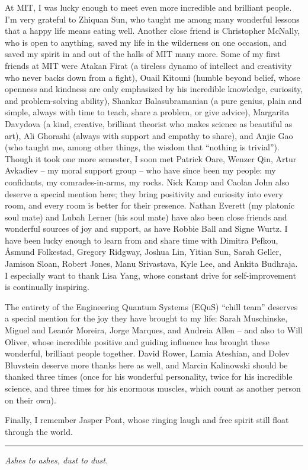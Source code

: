 At MIT, I was lucky enough to meet even more incredible and brilliant people.
%
I'm very grateful to Zhiquan Sun, who taught me among many wonderful lessons that a happy life means eating well.
%
Another close friend is Christopher McNally, who is open to anything, saved my life in the wilderness on one occasion, and saved my spirit in and out of the halls of MIT many more.
%
Some of my first friends at MIT were Atakan Firat (a tireless dynamo of intellect and creativity who never backs down from a fight), Ouail Kitouni (humble beyond belief, whose openness and kindness are only emphasized by his incredible knowledge, curiosity, and problem-solving ability), Shankar Balasubramanian (a pure genius, plain and simple, always with time to teach, share a problem, or give advice), Margarita Davydova (a kind, creative, brilliant theorist who makes science as beautiful as art), Ali Ghorashi (always with support and empathy to share), and Anjie Gao (who taught me, among other things, the wisdom that ``nothing is trivial'').
%
Though it took one more semester, I soon met Patrick Oare, Wenzer Qin, Artur Avkadiev -- my moral support group -- who have since been my people:
%
my confidants, my comrades-in-arms, my rocks.
%
Nick Kamp and Caolan John also deserve a special mention here;
%
they bring positivity and curiosity into every room, and every room is better for their presence.
%
Nathan Everett (my platonic soul mate) and Lubah Lerner (his soul mate) have also been close friends and wonderful sources of joy and support, as have Robbie Ball and Signe Wurtz.
%
I have been lucky enough to learn from and share time with Dimitra Pefkou, \r{A}smund Folkestad, Gregory Ridgway, Joshua Lin, Yitian Sun, Sarah Geller, Jamison Sloan, Robert Jones, Manu Srivastava, Kyle Lee, and Ankita Budhraja.
%
I especially want to thank Lisa Yang, whose constant drive for self-improvement is continually inspiring.


The entirety of the Engineering Quantum Systems (EQuS) ``chill team'' deserves a special mention for the joy they have brought to my life:
%
Sarah Muschinske, Miguel and Lean\'or Moreira, Jorge Marques, and Andreia Allen -- and also to Will Oliver, whose incredible positive and guiding influence has brought these wonderful, brilliant people together.
%
David Rower, Lamia Ateshian, and Dolev Bluvstein deserve more thanks here as well, and Marcin Kalinowski should be thanked three times (once for his wonderful personality, twice for his incredible science, and three times for his enormous muscles, which count as another person on their own).


Finally, I remember Jasper Pont, whose ringing laugh and free spirit still float through the world.

\vspace{12pt}
\hrule

\begin{center}
    \textit{Ashes to ashes, dust to dust.}
\end{center}
